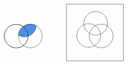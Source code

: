 \documentclass[12pt]{article}
\begin{document}
\[\begin{tikzpicture}[x=0.75pt,y=0.75pt,yscale=-1.08,xscale=1.08]
    \draw   (306.85,178.42) .. controls (306.85,166.51) and (316.51,156.85) .. (328.42,156.85) .. controls (340.34,156.85) and (350,166.51) .. (350,178.42) .. controls (350,190.34) and (340.34,200) .. (328.42,200) .. controls (316.51,200) and (306.85,190.34) .. (306.85,178.42) -- cycle ;
    \draw   (332.53,178.21) .. controls (332.53,166.29) and (342.19,156.63) .. (354.11,156.63) .. controls (366.03,156.63) and (375.69,166.29) .. (375.69,178.21) .. controls (375.69,190.13) and (366.03,199.79) .. (354.11,199.79) .. controls (342.19,199.79) and (332.53,190.13) .. (332.53,178.21) -- cycle ;
    \draw  [color={rgb, 255:red, 0; green, 0; blue, 0 }  ,draw opacity=1 ][fill={rgb, 255:red, 74; green, 144; blue, 226 }  ,fill opacity=1 ] (354.11,156.63) .. controls (358,156.63) and (361.66,157.67) .. (364.81,159.47) .. controls (364.08,170.72) and (354.72,179.62) .. (343.28,179.62) .. controls (339.39,179.62) and (335.73,178.59) .. (332.58,176.78) .. controls (333.31,165.53) and (342.67,156.63) .. (354.11,156.63) -- cycle ;
    \draw   (306.85,178.42) .. controls (306.85,166.51) and (316.51,156.85) .. (328.42,156.85) .. controls (340.34,156.85) and (350,166.51) .. (350,178.42) .. controls (350,190.34) and (340.34,200) .. (328.42,200) .. controls (316.51,200) and (306.85,190.34) .. (306.85,178.42) -- cycle ;
    \draw   (523.74,120) -- (523.74,223.74) -- (420,223.74) -- (420,120) -- cycle ;
    \draw   (494.2,159.56) .. controls (504.48,165.59) and (507.92,178.81) .. (501.88,189.09) .. controls (495.85,199.36) and (482.63,202.8) .. (472.35,196.77) .. controls (462.07,190.74) and (458.64,177.51) .. (464.67,167.24) .. controls (470.7,156.96) and (483.93,153.52) .. (494.2,159.56) -- cycle ;
    \draw   (484.15,136.42) .. controls (494.43,142.46) and (497.87,155.68) .. (491.83,165.96) .. controls (485.8,176.23) and (472.58,179.67) .. (462.3,173.64) .. controls (452.02,167.6) and (448.58,154.38) .. (454.62,144.11) .. controls (460.65,133.83) and (473.87,130.39) .. (484.15,136.42) -- cycle ;
    \draw   (471.33,158.68) .. controls (481.6,164.72) and (485.04,177.94) .. (479.01,188.21) .. controls (472.97,198.49) and (459.75,201.93) .. (449.48,195.9) .. controls (439.2,189.86) and (435.76,176.64) .. (441.79,166.36) .. controls (447.83,156.09) and (461.05,152.65) .. (471.33,158.68) -- cycle ;

\end{tikzpicture}\]
\end{document}
